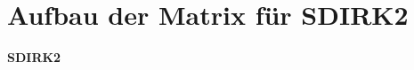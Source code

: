 \documentclass[aspectratio=169]{beamer}
\begin{document}
\section{Aufbau der Matrix für SDIRK2} 
\begin{frame}[fragile]
\textbf{SDIRK2}
\begin{columns}
\begin{column}{0.45\textwidth}

\end{column}
\begin{column}{0.5\textwidth}


\end{column}

\end{columns}
\end{frame}
\end{document}
